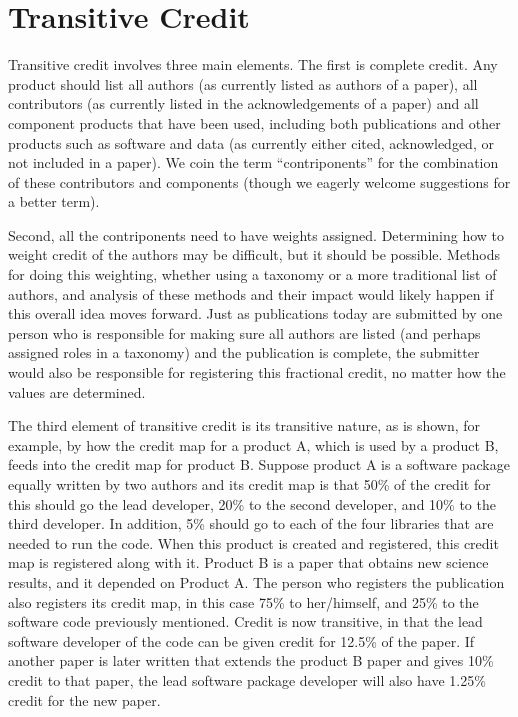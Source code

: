 \documentclass[a4paper,10pt]{article}
\begin{document}
\section{Transitive Credit}

Transitive credit involves three main elements.  The first is complete credit. Any product should list all authors (as currently listed as authors of a paper), all contributors (as currently listed in the acknowledgements of a paper) and all component products that have been used, including both publications and other products such as software and data (as currently either cited, acknowledged, or not included in a paper). We coin the term ``contriponents'' for the combination of these contributors and components (though we eagerly welcome suggestions for a better term).

Second, all the contriponents need to have weights assigned.
Determining how to weight credit of the authors may be difficult, but it should be possible. 
Methods for doing this weighting, whether using a taxonomy or a more traditional list of authors, and analysis of these methods and their impact would likely happen if this overall idea moves forward.
Just as publications today are submitted by one person who is responsible for making sure all authors are listed (and perhaps assigned roles in a taxonomy) and the publication is complete, the submitter would also be responsible for registering this fractional credit, no matter how the values are determined.

The third element of transitive credit is its transitive nature, as is shown, for example, by how the credit map for a product A, which is used by a product B, feeds into the credit map for product B. Suppose product A is a software package equally written by two authors and its credit map is that 50\% of the credit for this should go the lead developer, 20\% to the second developer, and 10\% to the third developer. In addition, 5\% should go to each of the four libraries that are needed to run the code. When this product is created and registered, this credit map is registered along with it.  Product B is a paper that obtains new science results, and it depended on Product A. The person who registers the publication also registers its credit map, in this case 75\% to her/himself, and 25\% to the software code previously mentioned. Credit is now transitive, in that the lead software developer of the code can be given credit for 12.5\% of the paper. If another paper is later written that extends the product B paper and gives 10\% credit to that paper, the lead software package developer will also have 1.25\% credit for the new paper.
\end{document}

